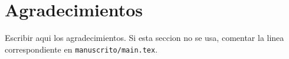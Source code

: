 \chapter*{Agradecimientos}

\noindent Escribir aqui los agradecimientos. Si esta seccion no se usa, comentar la linea correspondiente en \texttt{manuscrito/main.tex}.
